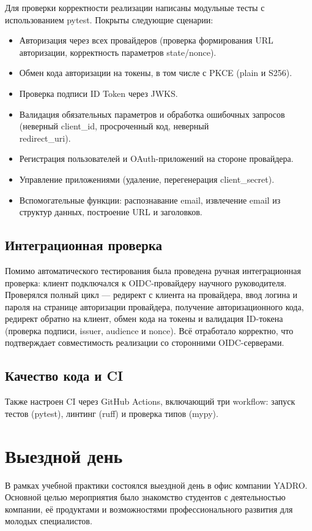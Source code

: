 \documentclass[a4paper]{article}
\begin{document}
Для проверки корректности реализации написаны модульные тесты с использованием pytest. Покрыты следующие сценарии:

\begin{itemize}
    \item Авторизация через всех провайдеров (проверка формирования URL авторизации, корректность параметров state/nonce).
    \item Обмен кода авторизации на токены, в том числе с PKCE (plain и S256).
    \item Проверка подписи ID Token через JWKS.
    \item Валидация обязательных параметров и обработка ошибочных запросов (неверный client\_id, просроченный код, неверный \\redirect\_uri).
    \item Регистрация пользователей и OAuth-приложений на стороне провайдера.
    \item Управление приложениями (удаление, перегенерация client\_secret).
    \item Вспомогательные функции: распознавание email, извлечение email из структур данных, построение URL и заголовков.
\end{itemize}

\subsection{Интеграционная проверка}

Помимо автоматического тестирования была проведена ручная интеграционная проверка: клиент подключался к OIDC-провайдеру научного руководителя. Проверялся полный цикл --- редирект с клиента на провайдера, ввод логина и пароля на странице авторизации провайдера, получение авторизационного кода, редирект обратно на клиент, обмен кода на токены и валидация ID-токена (проверка подписи, issuer, audience и nonce). Всё отработало корректно, что подтверждает совместимость реализации со сторонними OIDC-серверами.

\subsection{Качество кода и CI}

Также настроен CI через GitHub Actions, включающий три workflow: запуск тестов (pytest), линтинг (ruff) и проверка типов (mypy).

\section{Выездной день}
В рамках учебной практики состоялся выездной день в офис компании YADRO. Основной целью мероприятия было знакомство студентов с деятельностью компании, её продуктами и возможностями профессионального развития для молодых специалистов.
\end{document}
